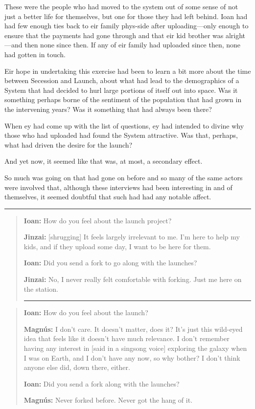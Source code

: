 These were the people who had moved to the system out of some sense of not just a better life for themselves, but one for those they had left behind. Ioan had had few enough ties back to eir family phys-side after uploading---only enough to ensure that the payments had gone through and that eir kid brother was alright---and then none since then. If any of eir family had uploaded since then, none had gotten in touch.

Eir hope in undertaking this exercise had been to learn a bit more about the time between Secession and Launch, about what had lead to the demographics of a System that had decided to hurl large portions of itself out into space. Was it something perhaps borne of the sentiment of the population that had grown in the intervening years? Was it something that had always been there?

When ey had come up with the list of questions, ey had intended to divine why those who had uploaded had found the System attractive. Was that, perhaps, what had driven the desire for the launch?

And yet now, it seemed like that was, at most, a secondary effect.

So much was going on that had gone on before and so many of the same actors were involved that, although these interviews had been interesting in and of themselves, it seemed doubtful that such had had any notable affect.

\begin{center}\rule{0.5\linewidth}{0.5pt}\end{center}

\begin{quote}
\textbf{Ioan:} How do you feel about the launch project?

\textbf{Jinzai:} {[}shrugging{]} It feels largely irrelevant to me. I'm here to help my kids, and if they upload some day, I want to be here for them.

\textbf{Ioan:} Did you send a fork to go along with the launches?

\textbf{Jinzai:} No, I never really felt comfortable with forking. Just me here on the station.

\begin{center}\rule{0.5\linewidth}{0.5pt}\end{center}
\end{quote}

\begin{quote}
\textbf{Ioan:} How do you feel about the launch?

\textbf{Magnús:} I don't care. It doesn't matter, does it? It's just this wild-eyed idea that feels like it doesn't have much relevance. I don't remember having any interest in {[}said in a singsong voice{]} exploring the galaxy when I was on Earth, and I don't have any now, so why bother? I don't think anyone else did, down there, either.

\textbf{Ioan:} Did you send a fork along with the launches?

\textbf{Magnús:} Never forked before. Never got the hang of it.
\end{quote}

